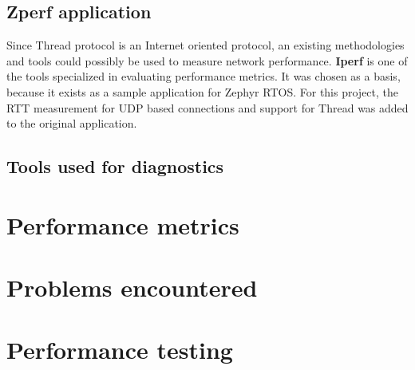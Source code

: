 \subsection*{Zperf application}

Since Thread protocol is an Internet oriented protocol, an existing methodologies and tools could possibly be used to measure network performance. \textbf{Iperf} is one of the tools specialized in evaluating performance metrics. It was chosen as a basis, because it exists as a sample application for Zephyr RTOS. For this project, the RTT measurement for UDP based connections and support for Thread was added to the original application.

\subsection{Tools used for diagnostics}


\medskip
\section{Performance metrics}

\medskip
\section{Problems encountered}

\medskip
\section{Performance testing}
